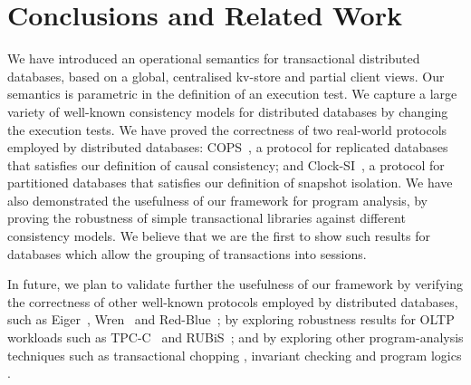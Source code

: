 \section{Conclusions and Related Work}
\label{sec:conclusions}
We have introduced  an  operational semantics for 
transactional distributed databases, based on a global, centralised 
kv-store and partial client views. 
Our semantics is parametric in the definition of an execution test.
We capture a large variety of well-known consistency models 
for distributed databases by changing  the execution tests. 
We have proved the correctness of two real-world protocols employed by distributed 
databases: COPS~\cite{cops}, a 
protocol for replicated databases that satisfies our definition of causal consistency;
and Clock-SI~\cite{clocksi}, a protocol for partitioned databases that satisfies our
definition of 
snapshot isolation. We have also demonstrated the usefulness of our framework
for program analysis, by proving the robustness of simple transactional 
libraries against different consistency models. We believe that we are
the first to show such  results for  databases which  allow
the grouping of  transactions into sessions. 

In future, we plan to validate further the usefulness of our framework
by verifying the correctness of other well-known protocols employed by
distributed databases, such as Eiger~\cite{eiger}, Wren~\cite{wren} and
Red-Blue~\cite{redblue}; by exploring robustness results for OLTP
workloads  such as TPC-C~\cite{tpcc} and RUBiS~\cite{rubis};
and by exploring other program-analysis techniques such as
transactional chopping \cite{chopping,psi-chopping}, invariant checking 
\cite{cise,repliss} and program logics \cite{alonetogether}. 


